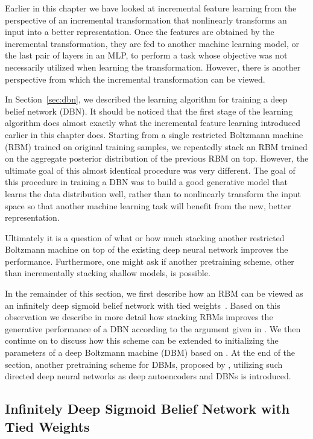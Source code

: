 \documentclass{now}
\begin{document}
Earlier in this chapter we have looked at incremental feature learning from the
perspective of an incremental transformation that nonlinearly transforms an
input into a better representation. Once the features are obtained by the
incremental transformation, they are fed to another machine learning model, or
the last pair of layers in an MLP, to perform a task whose objective was not
necessarily utilized when learning the transformation. However, there is another
perspective from which the incremental transformation can be viewed.

In Section~\ref{sec:dbn}, we described the learning algorithm for training a
deep belief network (DBN). It should be noticed that the first stage of the
learning algorithm does almost exactly what the incremental feature learning
introduced earlier in this chapter does. Starting from a single restricted
Boltzmann machine (RBM) trained on original training samples, we repeatedly
stack an RBM trained on the aggregate posterior distribution of the previous RBM
on top.  However, the ultimate goal of this almost identical procedure was very
different.  The goal of this procedure in training a DBN was to build a good
generative model that learns the data distribution well, rather than to
nonlinearly transform the input space so that another machine learning task will
benefit from the new, better representation.

Ultimately it is a question of what or how much stacking another restricted
Boltzmann machine on top of the existing deep neural network improves the
performance.  Furthermore, one might ask if another pretraining scheme, other
than incrementally stacking shallow models, is possible.

In the remainder of this section, we first describe how an RBM can be viewed as
an infinitely deep sigmoid belief network with tied
weights~\citep{Hinton2006nc}. Based on this observation we describe in more
detail how stacking RBMs improves the generative performance of a DBN according
to the argument given in \citep{Hinton2006nc,Salakhutdinov2012nc}.  We then
continue on to discuss how this scheme can be extended to initializing the
parameters of a deep Boltzmann machine (DBM) based on
\citep{Salakhutdinov2012nc,Salakhutdinov2012}. At the end of the section,
another pretraining scheme for DBMs, proposed by \citet{Cho13ICANN}, utilizing
such directed deep neural networks as deep autoencoders and DBNs is introduced.


\subsection{Infinitely Deep Sigmoid Belief Network with Tied Weights}
\label{sec:inf_sbn_rbm}
\end{document}
